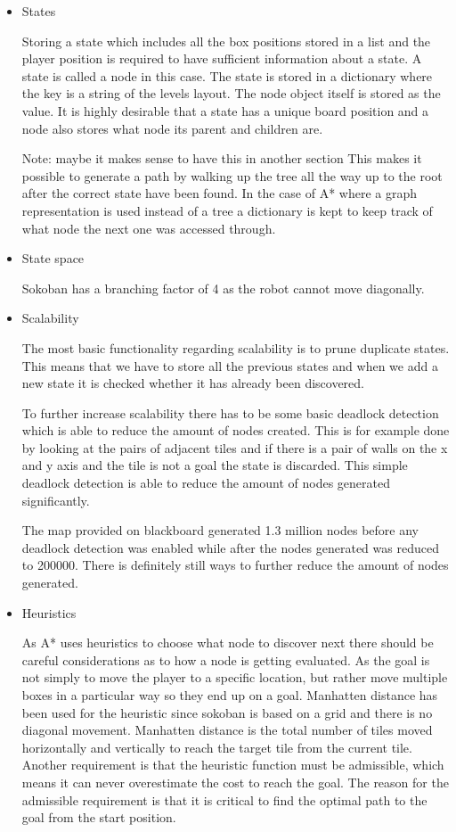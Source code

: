 \documentclass[../../maint.tex]{subfiles}
\begin{document}
\begin{itemize}
	\item States
	
	Storing a state which includes all the box positions stored in a list and the player position is required to have 				sufficient 	information about a state. A state is called a node in this case. The state is stored in a dictionary where 		the key is a string of the levels layout. The node object itself is stored as the value. It is highly desirable that a 			state has a unique board position and a node also stores what node its parent and children are. 

	Note: maybe it makes sense to have this in another section	
	This makes it possible to generate a path by walking up the tree all the way up to the root after the correct state have 		been found.
	In the case of A* where a graph representation is used instead of a tree a dictionary is kept to keep track of what node 		the next one was accessed through.
	
	\item State space
	
	Sokoban has a branching factor of 4 as the robot cannot move diagonally.	
	
	\item Scalability
	
	The most basic functionality regarding scalability is to prune duplicate states. This means that we have to store all the 			previous states and when we add a new state it is checked whether it has already been discovered.
	
	
	To further increase scalability there has to be some basic deadlock detection which is able to reduce the amount of nodes 		created. This is for example done by looking at the pairs of adjacent tiles and if there is a pair of walls on the x and y 	axis and the tile is not a goal the state is discarded. This simple deadlock detection is able to reduce the amount of 			nodes generated significantly. 
	
	The map provided on blackboard generated 1.3 million nodes before any deadlock detection was enabled while after the nodes 	generated was reduced to 200000. There is definitely still ways to further reduce the amount of nodes generated.
	
	\item Heuristics
	
	As A* uses heuristics to choose what node to discover next there should be careful considerations as to how a node is 			getting evaluated. As the goal is not simply to move the player to a specific location, but rather move multiple boxes in 		a particular way so they end up on a goal.
	Manhatten distance has been used for the heuristic since sokoban is based on a grid and there is no diagonal movement. 			Manhatten distance is the total number of tiles moved horizontally and vertically to reach the target tile from the 			current tile. Another requirement is that the heuristic function must be admissible, which means it can never overestimate 	the cost to reach the goal. The reason for the admissible requirement is that it is critical to find the optimal path to 		the goal from the start position.
	

\end{itemize}
\end{document}
